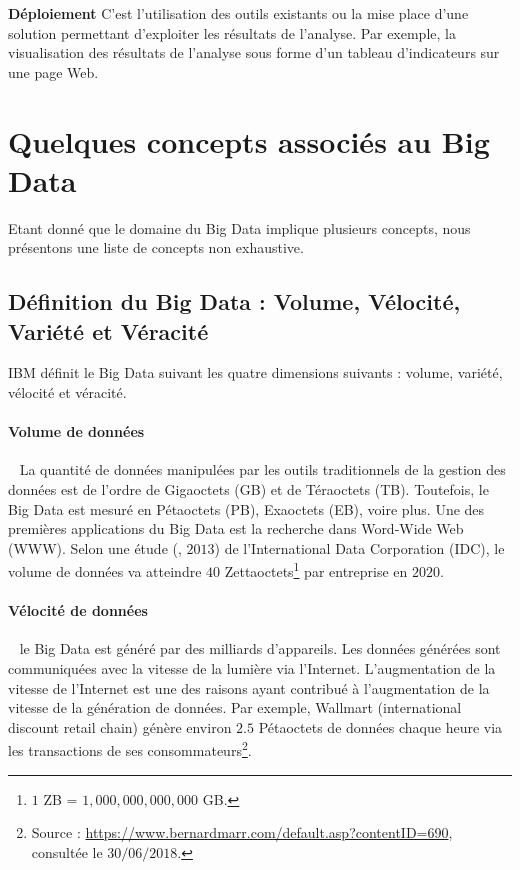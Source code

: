 \textbf{Déploiement}  C'est l'utilisation  des outils existants ou  la mise place d'une solution permettant d'exploiter les résultats de l'analyse. Par exemple, la  visualisation des résultats de l'analyse  sous forme d'un tableau d'indicateurs sur une page Web. \par
\section{Quelques concepts associés au Big Data}
Etant donné que le domaine du Big Data implique plusieurs concepts, nous présentons une liste de concepts  non exhaustive. 
\subsection{Définition du Big Data : Volume, Vélocité, Variété et Véracité}
		IBM définit le Big Data suivant les quatre dimensions suivants : volume, variété, vélocité et véracité. 
		\paragraph{Volume de données}~
		La quantité de données manipulées par les outils traditionnels de la gestion des données est de l'ordre de Gigaoctets (GB) et de Téraoctets (TB). Toutefois, le Big Data est mesuré en Pétaoctets (PB), Exaoctets (EB), voire plus. Une des premières applications du Big Data est la recherche dans Word-Wide Web (WWW). Selon une étude (\cite{6567202}, $2013$) de l'International Data Corporation (IDC), le volume de données  va atteindre $40$ Zettaoctets\footnote{ $ 1$ ZB = $1,000,000,000,000$ GB. } par  entreprise en $2020$.
		\paragraph{Vélocité de données} ~
		le Big Data est généré par des milliards
		d'appareils. Les données générées sont communiquées avec la vitesse de la lumière via l'Internet. L'augmentation de la vitesse de l'Internet est une  des raisons ayant contribué à l'augmentation de la vitesse de la génération de données.	
		Par exemple, Wallmart (international discount retail chain) génère environ   $2.5$ Pétaoctets de données chaque  heure via les transactions de ses consommateurs\footnote{Source : \url{https://www.bernardmarr.com/default.asp?contentID=690}, consultée le $ 30/06/2018 $.}.
